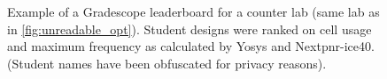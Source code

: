 
\begin{figure}[t]
    \centering
    \caption[
        Gradescope Leaderboard
    ]{
        Example of a Gradescope leaderboard for a counter lab (same lab as in \autoref{fig:unreadable_opt}). Student designs were ranked on cell usage and maximum frequency as calculated by Yosys and Nextpnr-ice40. (Student names have been obfuscated for privacy reasons).
    }
    \label{fig:leaderboard}
\end{figure}
